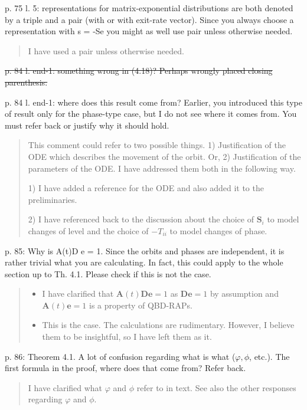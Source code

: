 \documentclass[a4paper]{article}
\begin{document}
p. 75 l. 5: representations for matrix-exponential distributions are both denoted by a triple and a pair (with or with exit-rate vector). Since you always choose a representation with s = -Se you might as well use pair unless otherwise needed.
\begin{quote}
    I have used a pair unless otherwise needed. 
\end{quote}

\st{p. 84 l. end-1: something wrong in (4.18)? Perhaps wrongly placed closing parenthesis.}

p. 84 l. end-1: where does this result come from? Earlier, you introduced this type of result only for the phase-type case, but I do not see where it comes from. You must refer back or justify why it should hold.
\begin{quote}
    This comment could refer to two possible things. 1) Justification of the ODE which describes the movement of the orbit. Or, 2) Justification of the parameters of the ODE. I have addressed them both in the following way. 

    1) I have added a reference for the ODE and also added it to the preliminaries.

    2) I have referenced back to the discussion about the choice of \(\boldsymbol S_i\) to model changes of level and the choice of \(-T_{ii}\) to model changes of phase. 
\end{quote}

p. 85: Why is A(t)D e = 1. Since the orbits and phases are independent, it is rather trivial what you are calculating. In fact, this could apply to the whole section up to Th. 4.1. Please check if this is not the case.
\begin{quote}
    \begin{itemize}
        \item I have clarified that \(\boldsymbol A(t)\boldsymbol D\boldsymbol e=1\) as \(\boldsymbol D\boldsymbol e=1\) by assumption and \(\boldsymbol A(t)\boldsymbol e=1\) is a property of QBD-RAPs. 
        \item This is the case. The calculations are rudimentary. However, I believe them to be insightful, so I have left them as it. 
    \end{itemize}
\end{quote}

p. 86: Theorem 4.1. A lot of confusion regarding what is what (\(\varphi, \phi\), etc.). The first formula in the proof, where does that come from? Refer back.
\begin{quote}
    I have clarified what \(\varphi\) and \(\phi\) refer to in text. See also the other responses regarding \(\varphi\) and \(\phi\). 
\end{quote}
\end{document}
